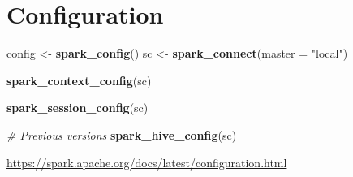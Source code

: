 \documentclass[]{book}
\newenvironment{Shaded}{\begin{snugshade}}{\end{snugshade}}
\newcommand{\CommentTok}[1]{\textcolor[rgb]{0.56,0.35,0.01}{\textit{#1}}}
\newcommand{\DataTypeTok}[1]{\textcolor[rgb]{0.13,0.29,0.53}{#1}}
\newcommand{\DecValTok}[1]{\textcolor[rgb]{0.00,0.00,0.81}{#1}}
\newcommand{\KeywordTok}[1]{\textcolor[rgb]{0.13,0.29,0.53}{\textbf{#1}}}
\newcommand{\NormalTok}[1]{#1}
\newcommand{\OperatorTok}[1]{\textcolor[rgb]{0.81,0.36,0.00}{\textbf{#1}}}
\newcommand{\StringTok}[1]{\textcolor[rgb]{0.31,0.60,0.02}{#1}}
\theoremstyle{definition}
\theoremstyle{definition}
\theoremstyle{definition}
\theoremstyle{remark}
\begin{document}
\begin{Shaded}
\end{Shaded}

\hypertarget{configuration}{%
\section{Configuration}\label{configuration}}

\begin{Shaded}
\begin{Highlighting}[]
\NormalTok{config <-}\StringTok{ }\KeywordTok{spark_config}\NormalTok{()}
\NormalTok{sc <-}\StringTok{ }\KeywordTok{spark_connect}\NormalTok{(}\DataTypeTok{master =} \StringTok{"local"}\NormalTok{)}

\KeywordTok{spark_context_config}\NormalTok{(sc)}

\KeywordTok{spark_session_config}\NormalTok{(sc)}

\CommentTok{# Previous versions}
\KeywordTok{spark_hive_config}\NormalTok{(sc)}
\end{Highlighting}
\end{Shaded}

\url{https://spark.apache.org/docs/latest/configuration.html}
\end{document}

